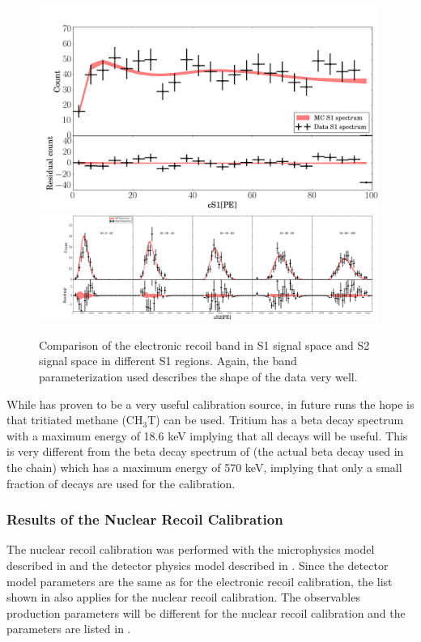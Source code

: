 	
\begin{figure}[t]
	\centering
	\includegraphics[width=0.99\textwidth]{xe1t_er_band_s1}
	\includegraphics[width=0.99\textwidth]{xe1t_er_band_s2}
	\caption{Comparison of the electronic recoil band in S1 signal space and S2 signal space in different S1 regions.  Again, the band parameterization used describes the shape of the data very well.}
	\label{fig:xe1t_er_band_width_median}
\end{figure}

While  has proven to be a very useful calibration source, in future runs the hope is that tritiated methane ($\textrm{CH}_3\textrm{T}$) can be used.  Tritium has a beta decay spectrum with a maximum energy of 18.6 keV implying that all decays will be useful.  This is very different from the beta decay spectrum of  (the actual beta decay used in the  chain) which has a maximum energy of 570 keV, implying that only a small fraction of decays are used for the calibration.

\clearpage

\subsubsection{Results of the Nuclear Recoil Calibration}

The nuclear recoil calibration was performed with the microphysics model described in  and the detector physics model described in .  Since the detector model parameters are the same as for the electronic recoil calibration, the list shown in  also applies for the nuclear recoil calibration.  The observables production parameters will be different for the nuclear recoil calibration and the parameters are listed in .


